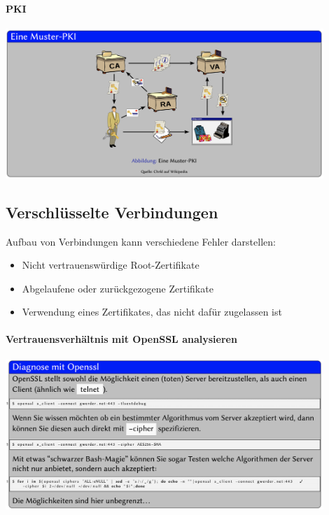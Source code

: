 \documentclass[a4paper,12pt]{article}
\begin{document}
\paragraph{PKI}

\begin{center}
\includegraphics[width=12cm]{img/05_pki.png}
\end{center}

\subsection{Verschlüsselte Verbindungen}

Aufbau von Verbindungen kann verschiedene Fehler darstellen:
\begin{itemize}
\item Nicht vertrauenswürdige Root-Zertifikate 
\item Abgelaufene oder zurückgezogene Zertifikate
\item Verwendung eines Zertifikates, das nicht dafür zugelassen ist
\end{itemize}

\paragraph{Vertrauensverhältnis mit OpenSSL analysieren}

\begin{center}
\includegraphics[width=12cm]{img/05_openssl.png}
\end{center}
\end{document}
